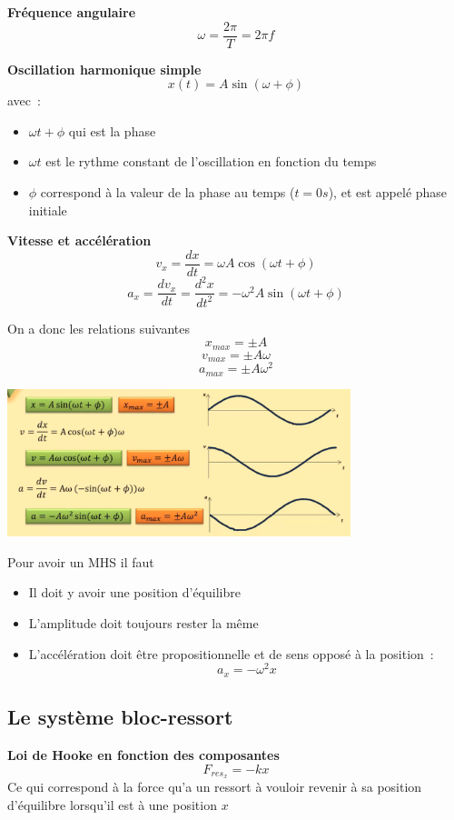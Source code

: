 \documentclass{article}
\begin{document}
\noindent
\textbf{Fréquence angulaire}
\[\omega = \frac{2\pi}{T} = 2\pi f\]
\newline

\noindent
\textbf{Oscillation harmonique simple}
\[x(t) = A\sin{(\omega + \phi)}\]
avec :
\begin{itemize}
    \item $\omega t + \phi$ qui est la phase
    \item $\omega t$ est le rythme constant de l'oscillation en fonction du temps
    \item $\phi$ correspond à la valeur de la phase au temps ($t = 0s$), et est appelé phase initiale
\end{itemize}
\newline

\noindent
\textbf{Vitesse et accélération}
\[v_x = \frac{dx}{dt} = \omega A \cos{(\omega t + \phi)}\]
\[a_x = \frac{dv_x}{dt} = \frac{d^2x}{dt^2} = -\omega^2A\sin{(\omega t + \phi)}\]
\newline

On a donc les relations suivantes
\[x_{max} = \pm A\]
\[v_{max} = \pm A\omega\]
\[a_{max} = \pm A\omega^2\]

\begin{center}
    \includegraphics[width=10cm]{Image/CinematiqueMHS.png}
\end{center}
\newline

Pour avoir un MHS il faut
\begin{itemize}
    \item Il doit y avoir une position d'équilibre
    \item L'amplitude doit toujours rester la même
    \item L'accélération doit être propositionnelle et de sens opposé à la position : 
    $$a_x = -\omega^2x$$
\end{itemize}

\subsection{Le système bloc-ressort}
\noindent
\textbf{Loi de Hooke en fonction des composantes}
\[F_{res_x} = -kx\]
Ce qui correspond à la force qu'a un ressort à vouloir revenir à sa position d'équilibre lorsqu'il est à une position $x$
\newline
\end{document}
